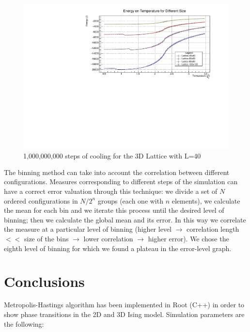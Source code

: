 \documentclass[11pt,a4paper]{article}
\begin{document}
\begin{figure}[h!]
  \centering
  \includegraphics[width=\columnwidth]{img/2d/c1.pdf}
  \caption{1,000,000,000 steps of cooling for the 3D Lattice with L=40}
\end{figure}



The binning method can take into account the correlation between different configurations. Measures corresponding to different steps of the simulation can have a correct error valuation through this technique: we divide a set of $N$ ordered configurations in $N/2^n$ groups (each one with $n$ elements), we calculate the mean for each bin and we iterate this process until the desired level of binning; then we calculate the global mean and its error. In this way we correlate the measure at a particular level of binning (higher level $\rightarrow$ correlation length $<<$ size of the bins $\rightarrow$ lower correlation $\rightarrow$ higher error). We chose the eighth level of binning for which we found a plateau in the error-level graph. 

\newpage
\section{Conclusions}
Metropolis-Hastings algorithm has been implemented in Root (C++) in order to show phase transitions in the 2D and 3D Ising model. Simulation parameters are the following:

\begin{center}
\end{center}
\end{document}

